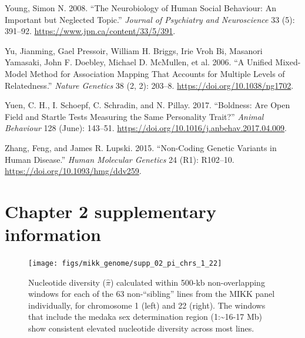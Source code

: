 \documentclass[
]{book}
\newlength{\cslhangindent}
\newlength{\cslentryspacingunit} %
\newenvironment{CSLReferences}[2] %
 {%
  \setlength{\parindent}{0pt}
  \ifodd #1
  \let\oldpar\par
  \def\par{\hangindent=\cslhangindent\oldpar}
  \fi
  \setlength{\parskip}{#2\cslentryspacingunit}
 }%
 {}
\begin{document}
\begin{CSLReferences}{1}{0}
\leavevmode{}%
Young, Simon N. 2008. {``The Neurobiology of Human Social Behaviour: An Important but Neglected Topic.''} \emph{Journal of Psychiatry and Neuroscience} 33 (5): 391--92. \url{https://www.jpn.ca/content/33/5/391}.

\leavevmode{}%
Yu, Jianming, Gael Pressoir, William H. Briggs, Irie Vroh Bi, Masanori Yamasaki, John F. Doebley, Michael D. McMullen, et al. 2006. {``A Unified Mixed-Model Method for Association Mapping That Accounts for Multiple Levels of Relatedness.''} \emph{Nature Genetics} 38 (2, 2): 203--8. \url{https://doi.org/10.1038/ng1702}.

\leavevmode{}%
Yuen, C. H., I. Schoepf, C. Schradin, and N. Pillay. 2017. {``Boldness: Are Open Field and Startle Tests Measuring the Same Personality Trait?''} \emph{Animal Behaviour} 128 (June): 143--51. \url{https://doi.org/10.1016/j.anbehav.2017.04.009}.

\leavevmode{}%
Zhang, Feng, and James R. Lupski. 2015. {``Non-Coding Genetic Variants in Human Disease.''} \emph{Human Molecular Genetics} 24 (R1): R102--10. \url{https://doi.org/10.1093/hmg/ddv259}.

\end{CSLReferences}

\hypertarget{appendix-appendix}{%
\appendix}


\hypertarget{chapter-2-supplementary-information}{%
\chapter{Chapter 2 supplementary information}\label{chapter-2-supplementary-information}}



\begin{figure}
\texttt{[image: figs/mikk\_genome/supp\_02\_pi\_chrs\_1\_22]} \caption{Nucleotide diversity (\(\hat{\pi}\)) calculated within 500-kb non-overlapping windows for each of the 63 non-``sibling'' lines from the MIKK panel individually, for chromosome 1 (left) and 22 (right). The windows that include the medaka sex determination region (1:\textasciitilde16-17 Mb) show consistent elevated nucleotide diversity across most lines.}\label{fig:nuc-div-per-indiv}
\end{figure}
\end{document}
